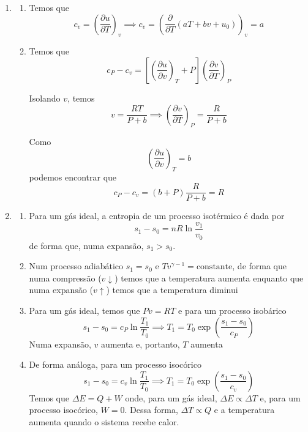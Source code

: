 \documentclass[12pt,a4paper,brazilian]{article}
\begin{document}
\begin{enumerate}
    \item%
        \begin{enumerate}
            \item Temos que
                \[
                    c_v = \left(\frac{\partial u}{\partial T}\right)_v \implies
                    c_v = \left(\frac{\partial}{\partial T}(aT+bv+u_0)\right)_v = a
                \]
            \item Temos que
                \[
                    c_P - c_v = \left[\left(\frac{\partial u}{\partial v}\right)_T+P\right]
                    \left(\frac{\partial v}{\partial T}\right)_P
                \]

                Isolando \(v\), temos
                \[
                    v = \frac{RT}{P+b} \implies 
                    \left(\frac{\partial v}{\partial T}\right)_P = 
                    \frac{R}{P+b}
                \]

                Como
                \[
                    \left(\frac{\partial u}{\partial v}\right)_T = b
                \]
                podemos encontrar que
                \[
                    c_P -c_v = (b+P)\frac{R}{P+b} = R
                \]
        \end{enumerate}
    \item%
        \begin{enumerate}   
            \item Para um gás ideal, a entropia de um processo isotérmico é dada por
                \[
                    s_1 - s_0 = nR \ln\frac{v_1}{v_0}
                \]
                de forma que, numa expansão, \(s_1 > s_0\).
            \item Num processo adiabático \(s_1 = s_0\) e \(Tv^{\gamma - 1}=\text{constante}\), de forma que
                numa compressão (\(v\downarrow\)) temos que a temperatura aumenta enquanto que numa
                expansão (\(v\uparrow\)) temos que a temperatura diminui
            \item Para um gás ideal, temos que \(Pv=RT\) e para um processo isobárico
                \[
                    s_1 - s_0 = c_P \ln\frac{T_1}{T_0} \implies
                    T_1 = T_0 \exp\left(\frac{s_1-s_0}{c_P}\right)
                \]
                Numa expansão, \(v\) aumenta e, portanto, \(T\) aumenta
            \item De forma análoga, para um processo isocórico
                \[
                    s_1 - s_0 = c_v \ln\frac{T_1}{T_0} \implies
                    T_1 = T_0 \exp\left(\frac{s_1-s_0}{c_v}\right)
                \]
                Temos que \(\Delta E = Q+W\) onde, para um gás ideal, \(\Delta E \propto \Delta T\) e,
                para um processo isocórico, \(W=0\). Dessa forma, \(\Delta T \propto Q\) e a temperatura 
                aumenta quando o sistema recebe calor.


\end{enumerate}
\end{enumerate}
\end{document}
